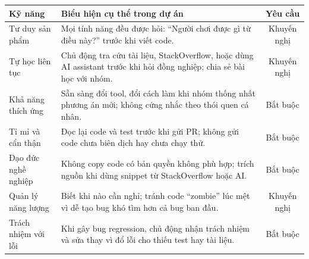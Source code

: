\documentclass[12pt,a4paper]{article}
\begin{document}
\begin{tabularx}{\linewidth}{|l|X|c|}
\hline
\rowcolor{gray!20}
\textbf{Kỹ năng} & \textbf{Biểu hiện cụ thể trong dự án} & \textbf{Yêu cầu} \\
\hline
Tư duy sản phẩm & Mọi tính năng đều được hỏi: ``Người chơi được gì từ điều này?''
                  trước khi viết code. & Khuyến nghị \\
\hline
Tự học liên tục & Chủ động tra cứu tài liệu, StackOverflow, hoặc dùng AI assistant
                  trước khi hỏi đồng nghiệp; chia sẻ bài học với nhóm. & Khuyến nghị \\
\hline
Khả năng thích ứng & Sẵn sàng đổi tool, đổi cách làm khi nhóm thống nhất phương án mới;
                     không cứng nhắc theo thói quen cá nhân. & Bắt buộc \\
\hline
Tỉ mỉ và cẩn thận & Đọc lại code và test trước khi gửi PR; không gửi code chưa biên
                    dịch hay chưa chạy thử. & Bắt buộc \\
\hline
Đạo đức nghề nghiệp & Không copy code có bản quyền không phù hợp; trích nguồn khi
                      dùng snippet từ StackOverflow hoặc AI. & Bắt buộc \\
\hline
Quản lý năng lượng & Biết khi nào cần nghỉ; tránh code ``zombie'' lúc mệt vì dễ tạo bug
                     khó tìm hơn cả bug ban đầu. & Khuyến nghị \\
\hline
Trách nhiệm với lỗi & Khi gây bug regression, chủ động nhận trách nhiệm và sửa thay vì
                      đổ lỗi cho thiếu test hay tài liệu. & Bắt buộc \\
\hline
\end{tabularx}

\label{LastPageSkillsetList}
\end{document}
